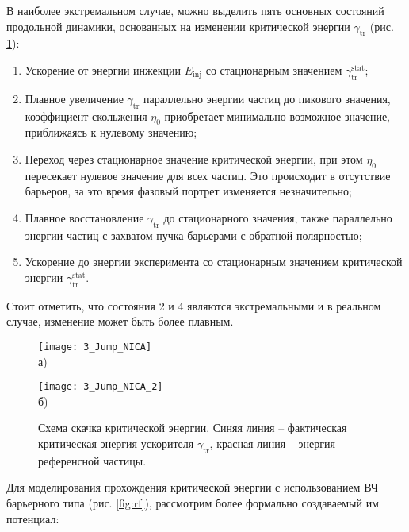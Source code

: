 В наиболее экстремальном случае, можно выделить пять основных состояний продольной динамики, основанных на изменении критической энергии
$\gamma_{\textrm{tr}}$ (рис. \ref{fig:jump_NICA}):

\begin{enumerate} 
  \item Ускорение от энергии инжекции $E_{\textrm{inj}}$ со стационарным значением $\gamma_{\textrm{tr}}^{\textrm{stat}}$;
  \item  Плавное увеличение $\gamma_{\textrm{tr}}$ параллельно энергии частиц до пикового значения, коэффициент скольжения $\eta_0$ приобретает минимально возможное значение, приближаясь к нулевому значению;
  \item Переход через стационарное значение критической энергии, при этом $\eta_0$ пересекает нулевое значение для всех частиц. Это происходит в отсутствие барьеров, за это время фазовый портрет изменяется незначительно;
  \item Плавное восстановление $\gamma_{\textrm{tr}}$ до стационарного значения, также па\-рал\-лель\-но энергии частиц с захватом пучка барьерами с обратной полярностью;
  \item Ускорение до энергии эксперимента со стационарным значением критической энергии $\gamma_{\textrm{tr}}^{\textrm{stat}}$.
\end{enumerate}

\noindent Стоит отметить, что состояния 2 и 4 являются экстремальными и в реальном случае, изменение может быть более плавным.

\begin{figure}[!h]
    \begin{minipage}[b][][b]{0.49\linewidth}\centering
        \texttt{[image: 3\_Jump\_NICA]} \\ а)
    \end{minipage}
    \hfill
    \begin{minipage}[b][][b]{0.49\linewidth}\centering
        \texttt{[image: 3\_Jump\_NICA\_2]} \\ б)
    \end{minipage}
    \caption{Схема скачка критической энергии. Синяя линия – фактическая критическая энергия ускорителя $\gamma_{\textrm{tr}}$, красная линия – энергия референсной частицы.}
    \label{fig:jump_NICA}
\end{figure}

\par Для моделирования прохождения критической энергии с использованием ВЧ барьерного типа (рис. \ref{fig:rf}), рассмотрим более формально создаваемый им потенциал:

